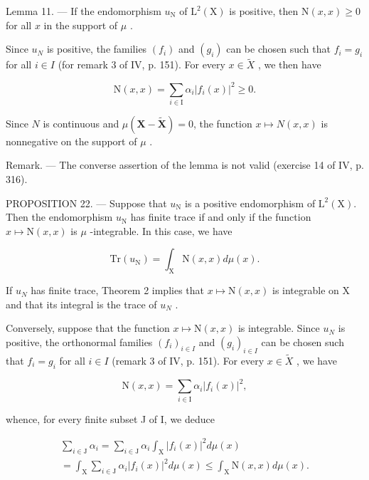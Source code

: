 Lemma 11. --- If the endomorphism \(u_{\mathrm{N}}\) of \(\mathrm{L}^2(\mathrm{X})\) is positive, then \(\mathrm{N}(x,x) \geqslant 0\) for all \(x\) in the support of \(\mu\) .

Since \(u_{N}\) is positive, the families \((f_{i})\) and \((g_{i})\) can be chosen such that \(f_{i} = g_{i}\) for all \(i \in I\) (for remark 3 of IV, p. 151). For every \(x \in \widetilde{X}\) , we then have

\[
\mathrm{N} (x, x) = \sum_ {i \in \mathrm{I}} \alpha_ {i} | f _ {i} (x) | ^ {2} \geqslant 0.
\]

Since \(N\) is continuous and \(\mu(\mathbf{X}-\widetilde{\mathbf{X}})=0\), the function \(x \mapsto N(x,x)\) is nonnegative on the support of \(\mu\) .

Remark. --- The converse assertion of the lemma is not valid (exercise 14 of IV, p. 316).

PROPOSITION 22. --- Suppose that \(u_{\mathrm{N}}\) is a positive endomorphism of \(\mathrm{L}^2(\mathrm{X})\). Then the endomorphism \(u_{\mathrm{N}}\) has finite trace if and only if the function \(x \mapsto \mathrm{N}(x,x)\) is \(\mu\) -integrable. In this case, we have

\[
\mathrm{Tr} (u _ {\mathrm{N}}) = \int_ {\mathrm{X}} \mathrm{N} (x, x) d \mu (x).
\]

If \(u_{N}\) has finite trace, Theorem 2 implies that \(x \mapsto \mathrm{N}(x, x)\) is integrable on X and that its integral is the trace of \(u_{N}\) .

Conversely, suppose that the function \(x \mapsto \mathrm{N}(x, x)\) is integrable. Since \(u_{N}\) is positive, the orthonormal families \((f_i)_{i \in I}\) and \((g_i)_{i \in I}\) can be chosen such that \(f_i = g_i\) for all \(i \in I\) (remark 3 of IV, p. 151). For every \(x \in \widetilde{X}\) , we have

\[
\mathrm{N} (x, x) = \sum_ {i \in \mathrm{I}} \alpha_ {i} | f _ {i} (x) | ^ {2},
\]

whence, for every finite subset J of I, we deduce

\[
\begin{array}{c} \sum_ {i \in \mathrm{J}} \alpha_ {i} = \sum_ {i \in \mathrm{J}} \alpha_ {i} \int_ {\mathrm{X}} | f _ {i} (x) | ^ {2} d \mu (x) \\ = \int_ {\mathrm{X}} \sum_ {i \in \mathrm{J}} \alpha_ {i} | f _ {i} (x) | ^ {2} d \mu (x) \leqslant \int_ {\mathrm{X}} \mathrm{N} (x, x) d \mu (x). \end{array}
\]

